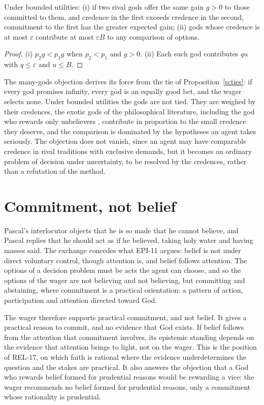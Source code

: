 \documentclass{situationist-preprint}
\begin{document}
\begin{proposition}\label{p:many}
Under bounded utilities: (i) if two rival gods offer the same gain $g > 0$ to those committed to them, and credence in the first exceeds credence in the second, commitment to the first has the greater expected gain; (ii) gods whose credence is at most $\varepsilon$ contribute at most $\varepsilon B$ to any comparison of options.
\end{proposition}

\begin{proof}
(i) $p_2 g < p_1 g$ when $p_2 < p_1$ and $g > 0$. (ii) Each such god contributes $q u$ with $q \leq \varepsilon$ and $u \leq B$.
\end{proof}

The many-gods objection derives its force from the tie of Proposition~\ref{p:ties}: if every god promises infinity, every god is an equally good bet, and the wager selects none. Under bounded utilities the gods are not tied. They are weighed by their credences, the exotic gods of the philosophical literature, including the god who rewards only unbelievers \citep{MouginSober1994}, contribute in proportion to the small credence they deserve, and the comparison is dominated by the hypotheses an agent takes seriously. The objection does not vanish, since an agent may have comparable credence in rival traditions with exclusive demands, but it becomes an ordinary problem of decision under uncertainty, to be resolved by the credences, rather than a refutation of the method.

\section{Commitment, not belief}\label{s:commit}

Pascal's interlocutor objects that he is so made that he cannot believe, and Pascal replies that he should act as if he believed, taking holy water and having masses said. The exchange concedes what EPI-11 argues: belief is not under direct voluntary control, though attention is, and belief follows attention. The options of a decision problem must be acts the agent can choose, and so the options of the wager are not believing and not believing, but committing and abstaining, where commitment is a practical orientation: a pattern of action, participation and attention directed toward God.

The wager therefore supports practical commitment, and not belief. It gives a practical reason to commit, and no evidence that God exists. If belief follows from the attention that commitment involves, its epistemic standing depends on the evidence that attention brings to light, not on the wager. This is the position of REL-17, on which faith is rational where the evidence underdetermines the question and the stakes are practical. It also answers the objection that a God who rewards belief formed for prudential reasons would be rewarding a vice: the wager recommends no belief formed for prudential reasons, only a commitment whose rationality is prudential.
\end{document}
